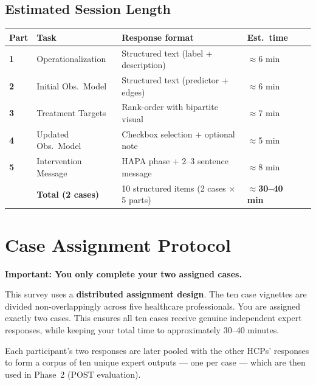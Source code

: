 \documentclass[11pt,a4paper]{article}
\begin{document}
\subsection{Estimated Session Length}

\begin{center}
\small
\begin{tabular}{@{}>{\bfseries}p{}p{}p{}p{}p{}@{}}
\toprule
\textbf{Part} & \textbf{Task} & \textbf{Response format} & \textbf{Est.\ time} & \\
\midrule
1 & Operationalization     & Structured text (label + description)   & $\approx$6 min & \\
2 & Initial Obs.\ Model    & Structured text (predictor + edges)     & $\approx$6 min & \\
3 & Treatment Targets      & Rank-order with bipartite visual         & $\approx$7 min & \\
4 & Updated Obs.\ Model    & Checkbox selection + optional note       & $\approx$5 min & \\
5 & Intervention Message   & HAPA phase + 2--3 sentence message       & $\approx$8 min & \\
\midrule
  & \textbf{Total (2 cases)} & 10 structured items (2 cases $\times$ 5 parts) & \textbf{$\approx$30--40 min} & \\
\bottomrule
\end{tabular}
\end{center}

\newpage

\newpage

\section{Case Assignment Protocol}
\label{sec:assignment}

\begin{tcolorbox}[colback=AccentAmber,colframe=GoldAmber,arc=2.5mm,boxrule=1.0pt,left=10pt,right=10pt,top=9pt,bottom=9pt]
\textbf{\color{GoldAmber}Important: You only complete your two assigned cases.}

\medskip\small
This survey uses a \textbf{distributed assignment design}. The ten case vignettes are divided non-overlappingly across five healthcare professionals. You are assigned exactly two cases. This ensures all ten cases receive genuine independent expert responses, while keeping your total time to approximately 30--40 minutes.

Each participant's two responses are later pooled with the other HCPs' responses to form a corpus of ten unique expert outputs --- one per case --- which are then used in Phase~2 (POST evaluation).
\end{tcolorbox}
\end{document}
